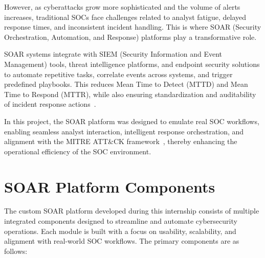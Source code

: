 However, as cyberattacks grow more sophisticated and the volume of alerts increases, traditional SOCs face challenges related to analyst fatigue, delayed response times, and inconsistent incident handling. This is where SOAR (Security Orchestration, Automation, and Response) platforms play a transformative role.

SOAR systems integrate with SIEM (Security Information and Event Management) tools, threat intelligence platforms, and endpoint security solutions to automate repetitive tasks, correlate events across systems, and trigger predefined playbooks. This reduces Mean Time to Detect (MTTD) and Mean Time to Respond (MTTR), while also ensuring standardization and auditability of incident response actions~\cite{paloalto_soar}.

In this project, the SOAR platform was designed to emulate real SOC workflows, enabling seamless analyst interaction, intelligent response orchestration, and alignment with the MITRE ATT\&CK framework~\cite{mitre_attack}, thereby enhancing the operational efficiency of the SOC environment.

\section*{SOAR Platform Components}

The custom SOAR platform developed during this internship consists of multiple integrated components designed to streamline and automate cybersecurity operations. Each module is built with a focus on usability, scalability, and alignment with real-world SOC workflows. The primary components are as follows:

